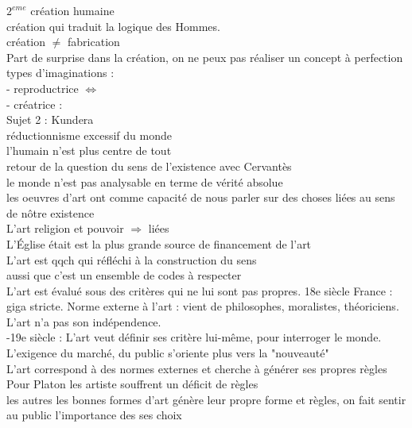 \documentclass[a4paper,twocolumn,landscape]{article}
\begin{document}
\noindent
\(2^{eme}\) création humaine\\
création qui traduit la logique des Hommes.\\
création \(\neq\) fabrication \\

Part de surprise dans la création, on ne peux pas réaliser un concept 
à perfection \\

 types d'imaginations : \\
- reproductrice \(\Leftrightarrow\) \\
- créatrice : \\

\noindent \colorbox{Apricot}{Sujet 2 : Kundera}\\
réductionnisme excessif du monde \\
l'humain n'est plus centre de tout \\
retour de la question du sens de l'existence avec Cervantès\\
le monde n'est pas analysable en terme de vérité absolue\\


\noindent les oeuvres d'art ont comme capacité de nous parler sur des 
choses liées au sens de nôtre existence \\

\noindent L'art religion et pouvoir \(\Rightarrow\) liées\\ 
L'Église était est la plus grande source de financement de l'art \\
L'art est qqch qui réfléchi à la construction du sens \\
aussi que c'est un ensemble de codes à respecter\\

\noindent L'art est évalué sous des critères qui ne lui sont pas 
propres. 18e siècle France : giga stricte. Norme externe à l'art : 
vient de philosophes, moralistes, théoriciens. L'art n'a pas son 
indépendence. \\

-19e siècle : L'art veut définir ses critère lui-même, pour interroger le monde.
L'exigence du marché, du public s'oriente plus vers la "nouveauté"\\
L'art correspond à des normes externes et cherche à générer ses 
propres règles\\
Pour Platon les artiste souffrent un déficit de règles \\
les autres les bonnes formes d'art génère leur propre forme et règles, 
on fait sentir au public l'importance des ses choix\\
\end{document}
